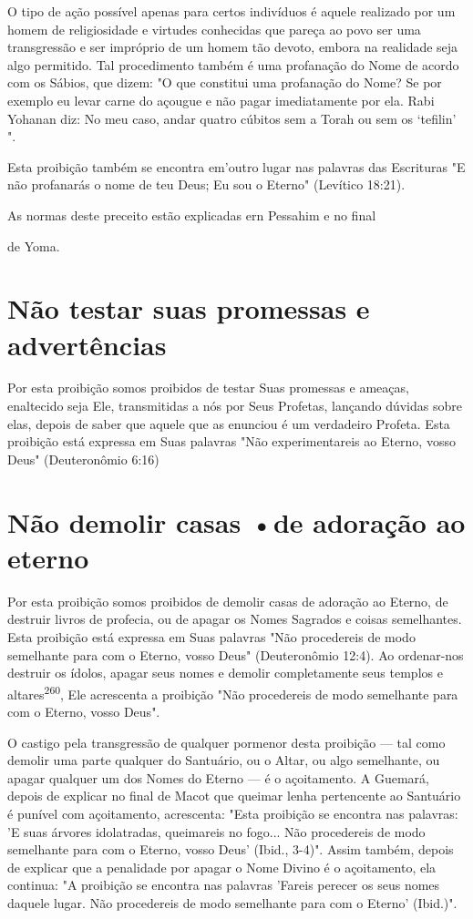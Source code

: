 O tipo de ação possível apenas para certos indivíduos é aquele
reali­zado por um homem de religiosidade e virtudes conhecidas que
pareça ao po­vo ser uma transgressão e ser impróprio de um homem tão
devoto, embora na realidade seja algo permitido. Tal procedimento também
é uma profanação do Nome de acordo com os Sábios, que dizem: "O que
constitui uma profana­ção do Nome? Se por exemplo eu levar carne do
açougue e não pagar imediata­mente por ela. Rabi Yohanan diz: No meu
caso, andar quatro cúbitos sem a Torah ou sem os `tefilin' ".

Esta proibição também se encontra em'outro lugar nas palavras das
Escrituras "E não profanarás o nome de teu Deus; Eu sou o Eterno"
(Levítico 18:21).


As normas deste preceito estão explicadas ern Pessahim e no final


de Yoma.

\section{Não testar suas promessas e advertências}

Por esta proibição somos proibidos de testar Suas promessas e amea­ças,
enaltecido seja Ele, transmitidas a nós por Seus Profetas, lançando
dúvidas sobre elas, depois de saber que aquele que as enunciou é um
verdadeiro Profe­ta. Esta proibição está expressa em Suas palavras "Não
experimentareis ao Eter­no, vosso Deus" (Deuteronômio 6:16)

\section{Não demolir casas •de adoração ao eterno}

Por esta proibição somos proibidos de demolir casas de adoração ao
Eterno, de destruir livros de profecia, ou de apagar os Nomes Sagrados e
coisas semelhantes. Esta proibição está expressa em Suas palavras "Não
proce­dereis de modo semelhante para com o Eterno, vosso Deus"
(Deuteronômio 12:4). Ao ordenar-nos destruir os ídolos, apagar seus
nomes e demolir comple­tamente seus templos e
altares\textsuperscript{260}, Ele acrescenta a proibição "Não
procedereis de modo semelhante para com o Eterno, vosso Deus".

O castigo pela transgressão de qualquer pormenor desta proibição --- tal
como demolir uma parte qualquer do Santuário, ou o Altar, ou algo
se­melhante, ou apagar qualquer um dos Nomes do Eterno --- é o
açoitamento. A Guemará, depois de explicar no final de Macot que queimar
lenha pertencen­te ao Santuário é punível com açoitamento, acrescenta:
"Esta proibição se en­contra nas palavras: 'E suas árvores idolatradas,
queimareis no fogo... Não pro­cedereis de modo semelhante para com o
Eterno, vosso Deus' (Ibid., 3-4)". As­sim também, depois de explicar que
a penalidade por apagar o Nome Divino é o açoitamento, ela continua: "A
proibição se encontra nas palavras 'Fareis perecer os seus nomes daquele
lugar. Não procedereis de modo semelhante para com o Eterno' (Ibid.)".


